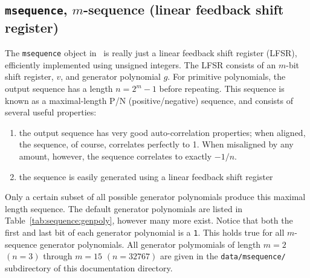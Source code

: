 \subsection{{\tt msequence}, $m$-sequence (linear feedback shift register)}
\label{module:sequence:msequence}
The {\tt msequence} object in \liquid\ is really just a linear feedback shift
register (LFSR), efficiently implemented using unsigned integers.
The LFSR consists of an $m$-bit shift register, $v$, and generator polynomial
$g$.
For primitive polynomials, the output sequence has a length $n=2^m-1$ before
repeating.
This sequence is known as a maximal-length P/N (positive/negative) sequence,
and consists of several useful properties:
\begin{enumerate}
\item the output sequence has very good auto-correlation properties; when
      aligned, the sequence, of course, correlates perfectly to 1.
      When misaligned by any amount, however, the sequence correlates to
      exactly $-1/n$.
\item the sequence is easily generated using a linear feedback shift register
\end{enumerate}
Only a certain subset of all possible generator polynomials produce this
maximal length sequence.
The default generator polynomials are listed in
Table~\ref{tab:sequence:genpoly}, however many more exist.
Notice that both the first and last bit of each generator polynomial is a
{\tt 1}.
This holds true for all $m$-sequence generator polynomials.
All generator polymomials of length $m=2$ $(n=3)$ through $m=15$ $(n=32767)$
are given in the {\tt data/msequence/} subdirectory of this documentation
directory.

